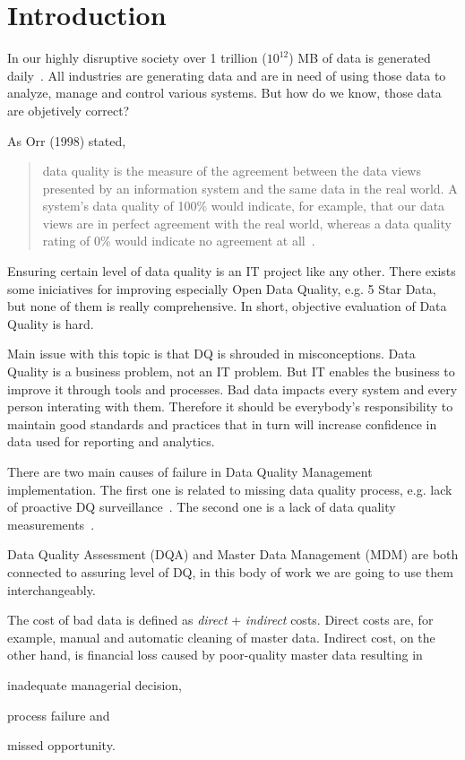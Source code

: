 \chapter{Introduction}\label{ch:introduction}

In our highly disruptive society over 1 trillion (\( 10^{12} \)) MB of data is generated daily~\cite{techjury2021}.
All industries are generating data and are in need of using those data to analyze, manage and control various systems.
But how do we know, those data are objetively correct?

As Orr (1998) stated,
\blockquote[][]{data quality is the measure of the agreement between the data views presented by an information system and the same data in the real world.
A system's data quality of 100\% would indicate, for example, that our data views are in perfect agreement with the real world, whereas a data quality rating of 0\% would indicate no agreement at all~\cite{orr1998}.}

Ensuring certain level of data quality is an IT project like any other.
There exists some iniciatives for improving especially Open Data Quality, e.g. 5 Star Data, but none of them is really comprehensive.
In short, objective evaluation of Data Quality is hard.

Main issue with this topic is that DQ is shrouded in misconceptions.
Data Quality is a business problem, not an IT problem.
But IT enables the business to improve it through tools and processes.
Bad data impacts every system and every person interating with them.
Therefore it should be everybody's responsibility to maintain good standards and practices that in turn will increase confidence in data used for reporting and analytics.

There are two main causes of failure in Data Quality Management implementation.
The first one is related to missing data quality process, e.g. lack of proactive DQ surveillance~\cite{risto2011}.
The second one is a lack of data quality measurements~\cite{haug2013}.

Data Quality Assessment (DQA) and Master Data Management (MDM) are both connected to assuring level of DQ, in this body of work we are going to use them interchangeably.

The cost of bad data is defined as \textit{direct} + \textit{indirect} costs.
Direct costs are, for example, manual and automatic cleaning of master data.
Indirect cost, on the other hand, is financial loss caused by poor-quality master data resulting in
\begin{enumerate*}[label=(\roman*)]
    \item inadequate managerial decision,
    \item process failure and
    \item missed opportunity.
\end{enumerate*}

